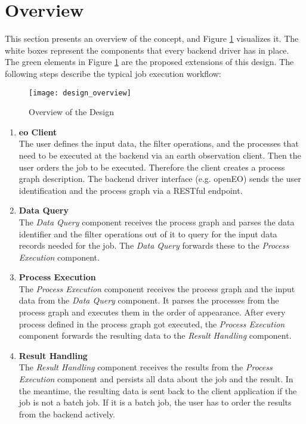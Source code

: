 \documentclass[draft,final]{vutinfth} %
\begin{document}
\section{Overview}\label{Design:Overview}
This section presents an overview of the concept, and Figure \ref{fig:overview} visualizes it. The white boxes represent the components that every backend driver has in place. The green elements in Figure \ref{fig:overview} are the proposed extensions of this design. The following steps describe the typical job execution workflow:

\begin{figure}[h]
	\centering
	\texttt{[image: design\_overview]}
	\caption{Overview of the Design}
	\label{fig:overview} 
\end{figure}

 \begin{enumerate}
	\item \textbf{\gls{eo} Client} \\
	The user defines the input data, the filter operations, and the processes that need to be executed at the backend via an earth observation client. Then the user orders the job to be executed. Therefore the client creates a process graph description. The backend driver interface (e.g. openEO) sends the user identification and the process graph via a RESTful endpoint.    
	\item \textbf{Data Query} \\ 
	The \textit{Data Query} component receives the process graph and parses the data identifier and the filter operations out of it to query for the input data records needed for the job. The \textit{Data Query} forwards these to the \textit{Process Execution} component.
	\item \textbf{Process Execution} \\
	The \textit{Process Execution} component receives the process graph and the input data from the \textit{Data Query} component. It parses the processes from the process graph and executes them in the order of appearance. After every process defined in the process graph got executed, the \textit{Process Execution} component forwards the resulting data to the \textit{Result Handling} component.   
	\item \textbf{Result Handling} \\ 
	The \textit{Result Handling} component receives the results from the \textit{Process Execution} component and persists all data about the job and the result. In the meantime, the resulting data is sent back to the client application if the job is not a batch job. If it is a batch job, the user has to order the results from the backend actively.  
\end{enumerate}
\end{document}
